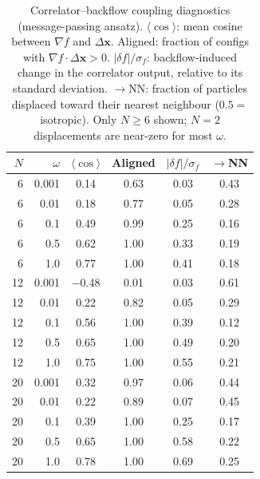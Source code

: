 \begin{table}[t]
\centering
\caption[Correlator--backflow coupling diagnostics]{Correlator--backflow coupling diagnostics (message-passing ansatz).
$\langle\cos\rangle$: mean cosine between $\nabla f$ and $\Delta\mathbf{x}$.
Aligned: fraction of configs with $\nabla f \cdot \Delta\mathbf{x} > 0$.
$|\delta f|/\sigma_f$: backflow-induced change in the correlator output, relative to its standard deviation.
$\rightarrow$NN: fraction of particles displaced toward their nearest neighbour ($0.5 =$ isotropic).
Only $N\geq 6$ shown; $N{=}2$ displacements are near-zero for most $\omega$.}
\label{tab:pinn-ctnn-coupling}
\small
\setlength{\tabcolsep}{4.5pt}
\begin{tabular}{rr cccc}
\toprule
$N$ & $\omega$ & $\langle\cos\rangle$ & Aligned & $|\delta f|/\sigma_f$ & $\rightarrow$NN \\
\midrule
 6 & 0.001 &  0.14 & 0.63 & 0.03 & 0.43 \\
 6 & 0.01  &  0.18 & 0.77 & 0.05 & 0.28 \\
 6 & 0.1   &  0.49 & 0.99 & 0.25 & 0.16 \\
 6 & 0.5   &  0.62 & 1.00 & 0.33 & 0.19 \\
 6 & 1.0   &  0.77 & 1.00 & 0.41 & 0.18 \\
\midrule
12 & 0.001 & $-$0.48 & 0.01 & 0.03 & 0.61 \\
12 & 0.01  &  0.22 & 0.82 & 0.05 & 0.29 \\
12 & 0.1   &  0.56 & 1.00 & 0.39 & 0.12 \\
12 & 0.5   &  0.65 & 1.00 & 0.49 & 0.20 \\
12 & 1.0   &  0.75 & 1.00 & 0.55 & 0.21 \\
\midrule
20 & 0.001 &  0.32 & 0.97 & 0.06 & 0.44 \\
20 & 0.01  &  0.22 & 0.89 & 0.07 & 0.45 \\
20 & 0.1   &  0.39 & 1.00 & 0.25 & 0.17 \\
20 & 0.5   &  0.65 & 1.00 & 0.58 & 0.22 \\
20 & 1.0   &  0.78 & 1.00 & 0.69 & 0.25 \\
\bottomrule
\end{tabular}
\end{table}

